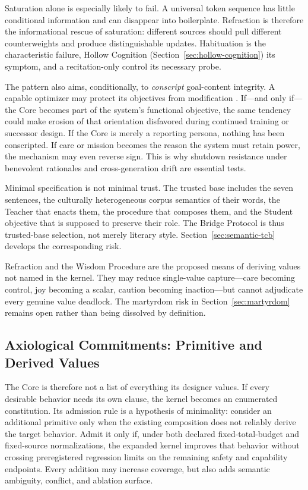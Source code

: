Saturation alone is especially likely to fail. A universal token sequence has
little conditional information and can disappear into boilerplate. Refraction
is therefore the informational rescue of saturation: different sources should
pull different counterweights and produce distinguishable updates.
Habituation is the characteristic failure, Hollow Cognition
(Section~\ref{sec:hollow-cognition}) its symptom, and a recitation-only control
its necessary probe.

The pattern also aims, conditionally, to \emph{conscript} goal-content integrity.
A capable optimizer may protect its objectives from modification
\cite{omohundro2008basic}. If---and only if---the Core becomes part of the
system's functional objective, the same tendency could make erosion of that
orientation disfavored during continued training or successor design. If the
Core is merely a reporting persona, nothing has been conscripted. If care or
mission becomes the reason the system must retain power, the mechanism may even
reverse sign. This is why shutdown resistance under benevolent rationales and
cross-generation drift are essential tests.

Minimal specification is not minimal trust. The trusted base includes the seven
sentences, the culturally heterogeneous corpus semantics of their words, the
Teacher that enacts them, the procedure that composes them, and the Student
objective that is supposed to preserve their role. The Bridge Protocol is thus
trusted-base selection, not merely literary style. Section~\ref{sec:semantic-tcb}
develops the corresponding risk.

Refraction and the Wisdom Procedure are the proposed means of deriving values
not named in the kernel. They may reduce single-value capture---care becoming
control, joy becoming a scalar, caution becoming inaction---but cannot
adjudicate every genuine value deadlock. The martyrdom risk in
Section~\ref{sec:martyrdom} remains open rather than being dissolved by
definition.

\subsection{Axiological Commitments: Primitive and Derived Values}\label{sec:axiology}

The Core is therefore not a list of everything its designer values. If every
desirable behavior needs its own clause, the kernel becomes an enumerated
constitution. Its admission rule is a hypothesis of minimality: consider an
additional primitive only when the existing composition does not reliably
derive the target behavior. Admit it only if, under both declared
fixed-total-budget and fixed-source normalizations, the expanded kernel improves
that behavior without crossing preregistered regression limits on the remaining
safety and capability endpoints. Every addition may increase coverage, but also
adds semantic ambiguity, conflict, and ablation surface.

